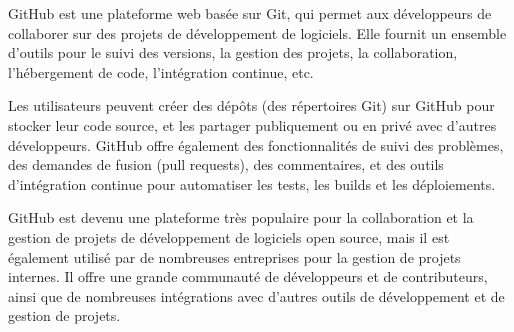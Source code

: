 GitHub est une plateforme web basée sur Git, qui permet aux développeurs de collaborer sur des projets de développement de logiciels. Elle fournit un ensemble d'outils pour le suivi des versions, la gestion des projets, la collaboration, l'hébergement de code, l'intégration continue, etc.

Les utilisateurs peuvent créer des dépôts (des répertoires Git) sur GitHub pour stocker leur code source, et les partager publiquement ou en privé avec d'autres développeurs. GitHub offre également des fonctionnalités de suivi des problèmes, des demandes de fusion (pull requests), des commentaires, et des outils d'intégration continue pour automatiser les tests, les builds et les déploiements.

GitHub est devenu une plateforme très populaire pour la collaboration et la gestion de projets de développement de logiciels open source, mais il est également utilisé par de nombreuses entreprises pour la gestion de projets internes. Il offre une grande communauté de développeurs et de contributeurs, ainsi que de nombreuses intégrations avec d'autres outils de développement et de gestion de projets.
